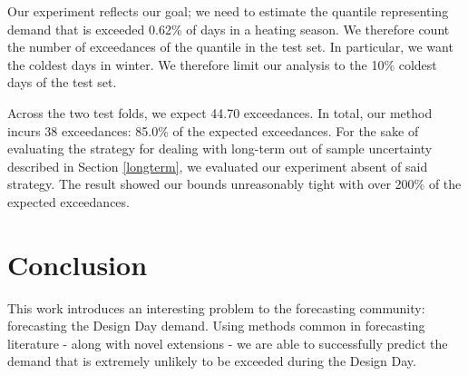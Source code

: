 \documentclass{article}
\begin{document}
Our experiment reflects our goal; we need to estimate the quantile representing demand that is exceeded 0.62\% of days in a heating season. We therefore count the number of exceedances of the quantile in the test set. In particular, we want the coldest days in winter. We therefore limit our analysis to the 10\% coldest days of the test set.

 Across the two test folds, we expect 44.70 exceedances. In total, our method incurs 38 exceedances: 85.0\% of the expected exceedances. For the sake of evaluating the strategy for dealing with long-term out of sample uncertainty described in Section \ref{longterm}, we evaluated our experiment absent of said strategy. The result showed our bounds unreasonably tight with over 200\% of the expected exceedances.

\section{Conclusion}

This work introduces an interesting problem to the forecasting community: forecasting the Design Day demand. Using methods common in forecasting literature - along with novel extensions - we are able to successfully predict the demand that is extremely unlikely to be exceeded during the Design Day. 





\end{document}
